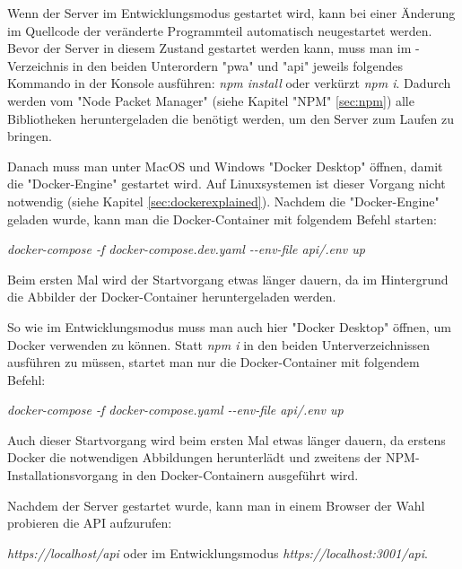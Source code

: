 
Wenn der Server im Entwicklungsmodus gestartet wird, kann bei einer Änderung im Quellcode der veränderte Programmteil automatisch neugestartet werden. Bevor der Server in diesem Zustand gestartet werden kann, muss man im \ZELIA-Verzeichnis in den beiden Unterordern "pwa" und "api" jeweils folgendes Kommando in der Konsole ausführen: \emph{npm install} oder verkürzt \emph{npm i}. Dadurch werden vom "Node Packet Manager" (siehe Kapitel "NPM" \ref{sec:npm}) alle Bibliotheken heruntergeladen die benötigt werden, um den Server zum Laufen zu bringen.

Danach muss man unter MacOS und Windows "Docker Desktop" öffnen, damit die "Docker-Engine" gestartet wird. Auf Linuxsystemen ist dieser Vorgang nicht notwendig (siehe Kapitel \ref{sec:dockerexplained}). Nachdem die "Docker-Engine" geladen wurde, kann man die Docker-Container mit folgendem Befehl starten:

\emph{docker-compose -f docker-compose.dev.yaml -{}-env-file api/.env up}  

Beim ersten Mal wird der Startvorgang etwas länger dauern, da im Hintergrund die Abbilder der Docker-Container heruntergeladen werden.


So wie im Entwicklungsmodus muss man auch hier "Docker Desktop" öffnen, um Docker verwenden zu können. Statt \emph{npm i} in den beiden Unterverzeichnissen ausführen zu müssen, startet man nur die Docker-Container mit folgendem Befehl:

\emph{docker-compose -f docker-compose.yaml -{}-env-file api/.env up}

Auch dieser Startvorgang wird beim ersten Mal etwas länger dauern, da erstens Docker die notwendigen Abbildungen herunterlädt und zweitens der NPM-Installationsvorgang in den Docker-Containern ausgeführt wird.

Nachdem der Server gestartet wurde, kann man in einem Browser der Wahl probieren die API aufzurufen:

\emph{https://localhost/api} oder im Entwicklungsmodus \emph{https://localhost:3001/api}.